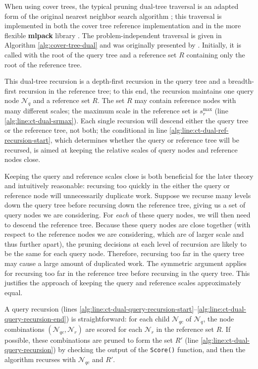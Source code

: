 When using cover trees, the typical pruning dual-tree traversal is an adapted
form of the original nearest neighbor search algorithm \citep[see
\texttt{Find-All-Nearest},][]{langford2006}; this traversal is implemented in
both the cover tree reference implementation and in the more flexible {\bf
mlpack} library \citep{mlpack2013}.  The problem-independent traversal is given
in Algorithm \ref{alg:cover-tree-dual} and was originally presented by
\citet{curtin2014dual}.  Initially, it is called with the root of the query tree
and a reference set $R$ containing only the root of the reference tree.

This dual-tree recursion is a depth-first recursion in the query tree and a
breadth-first recursion in the reference tree; to this end, the recursion
maintains one query node $\mathscr{N}_q$ and a reference set $R$.  The set $R$
may contain reference nodes with many different scales; the maximum scale in the
reference set is $s_r^{\max}$ (line \ref{alg:line:ct-dual-srmax}).  Each single
recursion will descend either the query tree or the reference tree, not both;
the conditional in line \ref{alg:line:ct-dual-ref-recursion-start}, which
determines whether the query or reference tree will be recursed, is aimed at
keeping the relative scales of query nodes and reference nodes close.

Keeping the query and reference scales close is both beneficial for the later
theory and intuitively reasonable: recursing too quickly in the either the query
or reference node will unnecessarily duplicate work.  Suppose we recurse many
levels down the query tree before recursing down the reference tree, giving us a
set of query nodes we are considering.  For {\it each} of these query nodes, we
will then need to descend the reference tree.  Because these query nodes are
close together (with respect to the reference nodes we are considering, which
are of larger scale and thus further apart), the pruning decisions at each level
of recursion are likely to be the same for each query node.  Therefore,
recursing too far in the query tree may cause a large amount of duplicated work.
The symmetric argument applies for recursing too far in the reference tree
before recursing in the query tree.  This justifies the approach of keeping the
query and reference scales approximately equal.

A query recursion (lines
\ref{alg:line:ct-dual-query-recursion-start}--\ref{alg:line:ct-dual-query-recursion-end})
is straightforward: for each child $\mathscr{N}_{qc}$ of $\mathscr{N}_q$, the
node combinations $(\mathscr{N}_{qc}, \mathscr{N}_r)$ are scored for each
$\mathscr{N}_r$ in the reference set $R$.  If possible, these combinations are
pruned to form the set $R'$ (line \ref{alg:line:ct-dual-query-recursion}) by
checking the output of the \texttt{Score()} function, and then the algorithm
recurses with $\mathscr{N}_{qc}$ and $R'$.

